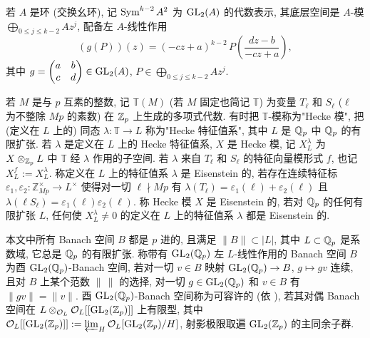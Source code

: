 若 $A$ 是环 (交换幺环), 记 $\operatorname{Sym}^{k-2}A^{2}$ 为 $\mathrm{GL}_2(A)$ 的代数表示, 其底层空间是 $A$-模 $\bigoplus_{0 \le j \le k-2} Az^{j}$, 配备左 $A$-线性作用
\[
(g(P))(z) = (-cz + a)^{k-2}\,P\!\left(\frac{dz-b}{-cz+a}\right),
\]
其中 $g = \begin{pmatrix} a & b \\ c & d \end{pmatrix} \in \mathrm{GL}_2(A)$, $P \in \bigoplus_{0 \le j \le k-2} Az^{j}$.

若 $M$ 是与 $p$ 互素的整数, 记 $\mathbb{T}(M)$ (若 $M$ 固定也简记 $\mathbb{T}$) 为变量 $T_{\ell}$ 和 $S_{\ell}$ ($\ell$ 为不整除 $Mp$ 的素数) 在 $\mathbb{Z}_p$ 上生成的多项式代数.
有时把 $\mathbb{T}$-模称为"Hecke 模", 把 (定义在 $L$ 上的) 同态 $\lambda : \mathbb{T} \to L$ 称为"Hecke 特征值系", 其中 $L$ 是 $\mathbb{Q}_p$ 中 $\mathbb{Q}_p$ 的有限扩张.
若 $\lambda$ 是定义在 $L$ 上的 Hecke 特征值系, $X$ 是 Hecke 模, 记 $X_{L}^{\lambda}$ 为 $X \otimes_{\mathbb{Z}_p} L$ 中 $\mathbb{T}$ 经 $\lambda$ 作用的子空间.
若 $\lambda$ 来自 $T_{\ell}$ 和 $S_{\ell}$ 的特征向量模形式 $f$, 也记 $X_{L}^{f} := X_{L}^{\lambda}$.
称定义在 $L$ 上的特征值系 $\lambda$ 是 Eisenstein 的, 若存在连续特征标 $\varepsilon_1,\varepsilon_2 : \mathbb{Z}_{Mp}^{\times} \to L^{\times}$ 使得对一切 $\ell \nmid Mp$ 有 $\lambda(T_{\ell}) = \varepsilon_1(\ell) + \varepsilon_2(\ell)$ 且 $\lambda(\ell S_{\ell}) = \varepsilon_1(\ell)\varepsilon_2(\ell)$.
称 Hecke 模 $X$ 是 Eisenstein 的, 若对 $\mathbb{Q}_p$ 的任何有限扩张 $L$, 任何使 $X_{L}^{\lambda} \neq 0$ 的定义在 $L$ 上的特征值系 $\lambda$ 都是 Eisenstein 的.

本文中所有 Banach 空间 $B$ 都是 $p$ 进的, 且满足 $\|B\| \subset |L|$, 其中 $L \subset \mathbb{Q}_p$ 是系数域, 它总是 $\mathbb{Q}_p$ 的有限扩张.
称带有 $\mathrm{GL}_2(\mathbb{Q}_p)$ 左 $L$-线性作用的 Banach 空间 $B$ 为酉 $\mathrm{GL}_2(\mathbb{Q}_p)$-Banach 空间, 若对一切 $v \in B$ 映射 $\mathrm{GL}_2(\mathbb{Q}_p) \to B$, $g \mapsto gv$ 连续, 且对 $B$ 上某个范数 $\|\,\|$ 的选择, 对一切 $g \in \mathrm{GL}_2(\mathbb{Q}_p)$ 和 $v \in B$ 有 $\|gv\| = \|v\|$.
酉 $\mathrm{GL}_2(\mathbb{Q}_p)$-Banach 空间称为可容许的 (依 \cite[\S3]{ref:43}), 若其对偶 Banach 空间在 $L \otimes_{\mathcal{O}_L} \mathcal{O}_L[[\mathrm{GL}_2(\mathbb{Z}_p)]]$ 上有限型, 其中 $\mathcal{O}_L[[\mathrm{GL}_2(\mathbb{Z}_p)]] := \varprojlim_{H} \mathcal{O}_L[\mathrm{GL}_2(\mathbb{Z}_p)/H]$, 射影极限取遍 $\mathrm{GL}_2(\mathbb{Z}_p)$ 的主同余子群.
